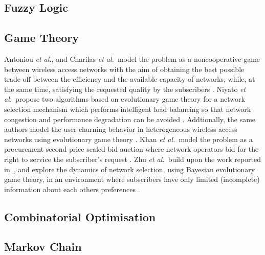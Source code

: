
\subsection{Fuzzy Logic} %
\label{sub:fuzzy_logic_intelligent}


\subsection{Game Theory} %
\label{sub:game_theory_intelligent}
Antoniou \emph{et al.}, and Charilas \emph{et al.}~model the problem as a noncooperative game between wireless access networks with the aim of obtaining the best possible trade-off between the efficiency and the available capacity of networks, while, at the same time, satisfying the requested quality by the subscribers \cite{Antoniou07, Charilas08}. Niyato \emph{et al.}~propose two algorithms based on evolutionary game theory for a network selection mechanism which performs intelligent load balancing so that network congestion and performance degradation can be avoided \cite{Niyato09}. Addtionally, the same authors model the user churning behavior in heterogeneous wireless access networks using evolutionary game theory \cite{NiyatoHossainConf2008}. Khan \emph{et al.}~model the problem as a procurement second-price sealed-bid auction where network operators bid for the right to service the subscriber's request \cite{Khan110, Khan210}. Zhu \emph{et al.}~build upon the work reported in~\cite{Niyato09}, and explore the dynamics of network selection, using Bayesian evolutionary game theory, in an environment where subscribers have only limited (incomplete) information about each others preferences \cite{ZhuNiyato2010}.

\subsection{Combinatorial Optimisation} %
\label{sub:combinatorial_optimisation_intelligent}


\subsection{Markov Chain} %
\label{sub:markov_chain_intelligent}

